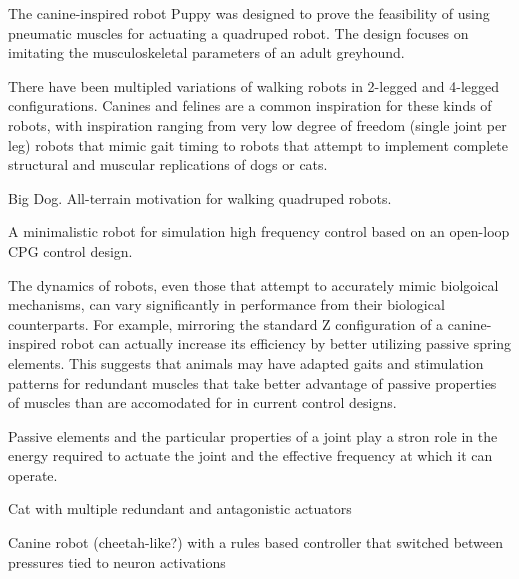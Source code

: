 
The canine-inspired robot Puppy was designed to prove the feasibility of using
pneumatic muscles for actuating a quadruped robot. The design focuses on 
imitating the musculoskeletal parameters of an adult greyhound. 
\cite{PuppyDesign}


There have been multipled variations of walking robots in 2-legged and 4-legged
configurations. Canines and felines are a common inspiration for these kinds of
robots, with inspiration ranging from very low degree of freedom (single joint
per leg) robots that mimic gait timing to robots that attempt to implement
complete structural and muscular replications of dogs or cats.


Big Dog. All-terrain motivation for walking quadruped robots. \cite{BigDog}

A minimalistic robot for simulation high frequency control based on an open-loop
CPG control design. 
\cite{Narioka2012}


The dynamics of robots, even those that attempt to accurately mimic biolgoical
mechanisms, can vary significantly in performance from their biological
counterparts. For example, mirroring the standard Z configuration of a canine-
inspired robot can actually increase its efficiency by better utilizing passive
spring elements. This suggests that animals may have adapted gaits and
stimulation patterns for redundant muscles that take better advantage of passive
properties of muscles than are accomodated for in current control designs.
\cite{HindLegMorphology}

Passive elements and the particular properties of a joint play a stron role in
the energy required to actuate the joint and the effective frequency at which it
can operate. \cite{Na2015}




Cat with multiple redundant and antagonistic actuators
\cite{Rosendo2013}

Canine robot (cheetah-like?) with a rules based controller that switched between
pressures tied to neuron activations
\cite{Pneupard2013}

